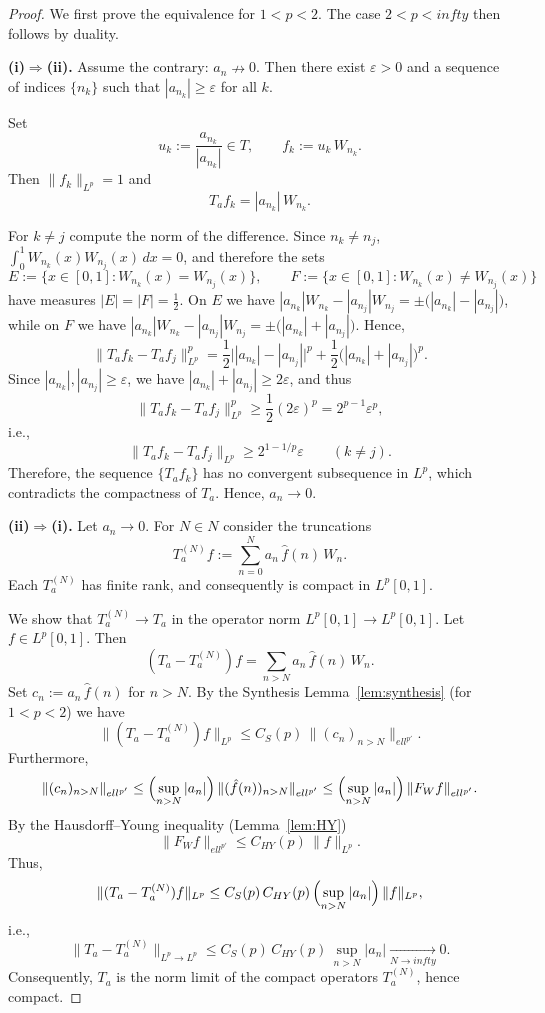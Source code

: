 \documentclass[a4paper,12pt]{article}
\theoremstyle{definition}
\theoremstyle{remark}
\theoremstyle{definition}
\newcommand{\Lp}{L^p[0,1]}
\newcommand{\F}{\mathcal{F}_W}
\def\infty{infty}%
\def\ell{ell}%
\def\mathbb#1{#1}%
\def\mathcal#1{#1}%
\begin{document}
\begin{proof}
We first prove the equivalence for $1<p<2$.
The case $2<p<\infty$ then follows by duality.

\textbf{(i)$\Rightarrow$(ii).}
Assume the contrary: $a_n\nrightarrow 0$.
Then there exist $\varepsilon>0$ and a sequence of indices $\{n_k\}$ such that
$|a_{n_k}|\ge\varepsilon$ for all $k$.

Set
\[
u_k:=\frac{a_{n_k}}{|a_{n_k}|}\in\mathbb T,\qquad
f_k:=u_k\,W_{n_k}.
\]
Then $\|f_k\|_{L^p}=1$ and
\[
T_af_k = |a_{n_k}|\,W_{n_k}.
\]

For $k\neq j$ compute the norm of the difference. Since $n_k\neq n_j$,
$\int_0^1 W_{n_k}(x)W_{n_j}(x)\,dx=0$, and therefore the sets
\[
E:=\{x\in[0,1]: W_{n_k}(x)=W_{n_j}(x)\},\qquad
F:=\{x\in[0,1]: W_{n_k}(x)\neq W_{n_j}(x)\}
\]
have measures $|E|=|F|=\frac12$.
On $E$ we have
$|a_{n_k}|W_{n_k}-|a_{n_j}|W_{n_j}=\pm\bigl(|a_{n_k}|-|a_{n_j}|\bigr)$,
while on $F$ we have
$|a_{n_k}|W_{n_k}-|a_{n_j}|W_{n_j}=\pm\bigl(|a_{n_k}|+|a_{n_j}|\bigr)$.
Hence,
\[
\|T_af_k-T_af_j\|_{L^p}^p
= \frac12\bigl||a_{n_k}|-|a_{n_j}|\bigr|^p
 + \frac12\bigl(|a_{n_k}|+|a_{n_j}|\bigr)^p.
\]
Since $|a_{n_k}|,|a_{n_j}|\ge\varepsilon$, we have $|a_{n_k}|+|a_{n_j}|\ge 2\varepsilon$, and thus
\[
\|T_af_k-T_af_j\|_{L^p}^p \ge \frac12(2\varepsilon)^p
= 2^{p-1}\varepsilon^p,
\]
i.e.,
\[
\|T_af_k-T_af_j\|_{L^p}\ge 2^{1-1/p}\varepsilon\qquad(k\neq j).
\]
Therefore, the sequence $\{T_af_k\}$ has no convergent subsequence in $L^p$,
which contradicts the compactness of $T_a$. Hence, $a_n\to0$.

\medskip
\textbf{(ii)$\Rightarrow$(i).}
Let $a_n\to0$.
For $N\in\mathbb{N}$ consider the truncations
\[
T_a^{(N)}f := \sum_{n=0}^N a_n\,\hat{f}(n)\,W_n.
\]
Each $T_a^{(N)}$ has finite rank, and consequently is compact in $\Lp$.

We show that $T_a^{(N)}\to T_a$ in the operator norm $\Lp\to\Lp$.
Let $f\in\Lp$. Then
\[
(T_a-T_a^{(N)})f=\sum_{n>N} a_n\,\hat{f}(n)\,W_n.
\]
Set $c_n:=a_n\,\hat{f}(n)$ for $n>N$.
By the Synthesis Lemma~\ref{lem:synthesis} (for $1<p<2$) we have
\[
\|(T_a-T_a^{(N)})f\|_{L^p}
\le C_S(p)\,\|(c_n)_{n>N}\|_{\ell^{p'}}.
\]
Furthermore,
\[
\|(c_n)_{n>N}\|_{\ell^{p'}}
\le \Bigl(\sup_{n>N}|a_n|\Bigr)\,\|(\hat{f}(n))_{n>N}\|_{\ell^{p'}}
\le \Bigl(\sup_{n>N}|a_n|\Bigr)\,\|\F f\|_{\ell^{p'}}.
\]
By the Hausdorff–Young inequality (Lemma~\ref{lem:HY})
\[
\|\F f\|_{\ell^{p'}}\le C_{HY}(p)\,\|f\|_{L^p}.
\]
Thus,
\[
\|(T_a-T_a^{(N)})f\|_{L^p}
\le C_S(p)\,C_{HY}(p)\,\Bigl(\sup_{n>N}|a_n|\Bigr)\,\|f\|_{L^p},
\]
i.e.,
\[
\|T_a-T_a^{(N)}\|_{L^p\to L^p}
\le C_S(p)\,C_{HY}(p)\,\sup_{n>N}|a_n|\xrightarrow[N\to\infty]{}0.
\]
Consequently, $T_a$ is the norm limit of the compact operators $T_a^{(N)}$,
hence compact.


\end{proof}
\end{document}
